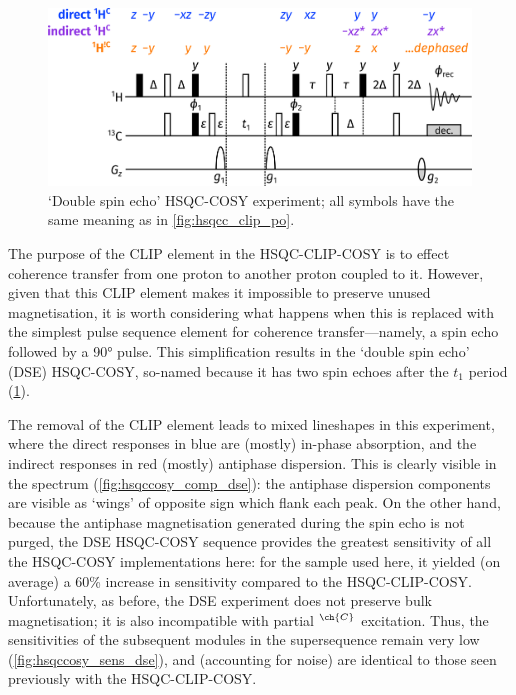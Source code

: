 \documentclass[a4paper,12pt]{article}
\newcommand{\magn}[1]{\ch{^1H}$^{\ch{#1}}$}
\begin{document}
\begin{refsection}
\begin{figure}[!ht]
    \centering
    \includegraphics[]{dse_po.png}%
    \caption[Double spin echo HSQC-COSY experiment]{
        `Double spin echo' HSQC-COSY experiment; all symbols have the same meaning as in \cref{fig:hsqcc_clip_po}.
    }
    \label{fig:hsqcc_dse_po}
\end{figure}

The purpose of the CLIP element in the HSQC-CLIP-COSY is to effect coherence transfer from one proton to another proton coupled to it.
However, given that this CLIP element makes it impossible to preserve unused magnetisation, it is worth considering what happens when this is replaced with the simplest pulse sequence element for coherence transfer---namely, a spin echo followed by a \ang{90} pulse.
This simplification results in the `double spin echo' (DSE) HSQC-COSY, so-named because it has two spin echoes after the $t_1$ period (\cref{fig:hsqcc_dse_po}).

The removal of the CLIP element leads to mixed lineshapes in this experiment, where the direct responses in blue are (mostly) in-phase absorption, and the indirect responses in red (mostly) antiphase dispersion.
This is clearly visible in the spectrum (\cref{fig:hsqccosy_comp_dse}): the antiphase dispersion components are visible as `wings' of opposite sign which flank each peak.
On the other hand, because the antiphase magnetisation generated during the spin echo is not purged, the DSE HSQC-COSY sequence provides the greatest sensitivity of all the HSQC-COSY implementations here: for the sample used here, it yielded (on average) a 60\% increase in sensitivity compared to the HSQC-CLIP-COSY.
Unfortunately, as before, the DSE experiment does not preserve bulk magnetisation; it is also incompatible with partial \magn{C} excitation.
Thus, the sensitivities of the subsequent modules in the  supersequence remain very low (\cref{fig:hsqccosy_sens_dse}), and (accounting for noise) are identical to those seen previously with the HSQC-CLIP-COSY.


\end{refsection}
\end{document}
